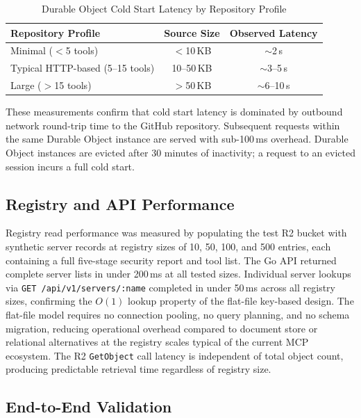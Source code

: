 \documentclass[conference]{IEEEtran}
\begin{document}
\begin{table}[htbp]
  \caption{Durable Object Cold Start Latency by Repository Profile}
  \label{tab:coldstart}
  \centering
  \begin{tabular}{lcc}
    \toprule
    \textbf{Repository Profile} & \textbf{Source Size} & \textbf{Observed Latency} \\
    \midrule
    Minimal ($<$5 tools)              & $<$10\,KB   & $\sim$2\,s      \\
    Typical HTTP-based (5--15 tools)  & 10--50\,KB  & $\sim$3--5\,s   \\
    Large ($>$15 tools)               & $>$50\,KB   & $\sim$6--10\,s  \\
    \bottomrule
  \end{tabular}
\end{table}

These measurements confirm that cold start latency is dominated by
outbound network round-trip time to the GitHub repository.
Subsequent requests within the same Durable Object instance are served
with sub-100\,ms overhead.
Durable Object instances are evicted after 30 minutes of inactivity;
a request to an evicted session incurs a full cold start.

\subsection{Registry and API Performance}

Registry read performance was measured by populating the test R2 bucket
with synthetic server records at registry sizes of 10, 50, 100, and 500
entries, each containing a full five-stage security report and tool
list.
The Go API returned complete server lists in under 200\,ms at all
tested sizes.
Individual server lookups via \texttt{GET /api/v1/servers/:name}
completed in under 50\,ms across all registry sizes, confirming the
$O(1)$ lookup property of the flat-file key-based design.
The flat-file model requires no connection pooling, no query planning,
and no schema migration, reducing operational overhead compared to
document store or relational alternatives at the registry scales typical
of the current MCP ecosystem.
The R2 \texttt{GetObject} call latency is independent of total object
count, producing predictable retrieval time regardless of registry size.

\subsection{End-to-End Validation}
\end{document}
